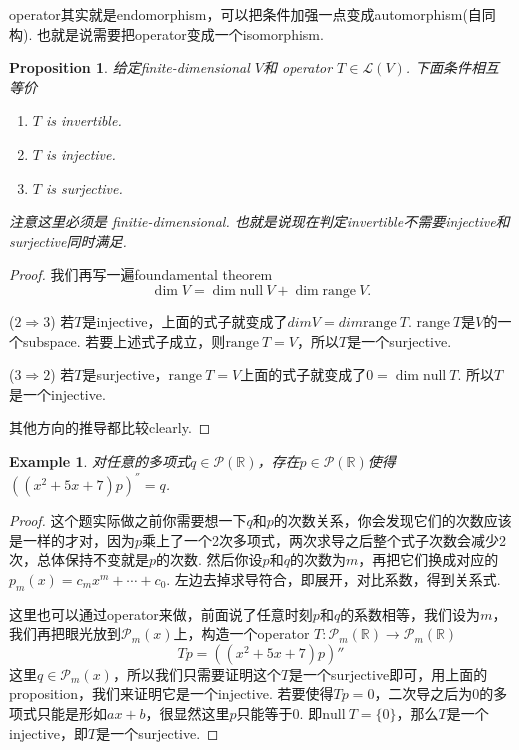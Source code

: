 \documentclass{article}
\newtheorem{proposition}[theorem]{Proposition}
\newtheorem{example}[theorem]{Example}
\newcommand*{\xfunc}[4]{{#2}\colon{#3}{#1}{#4}}
\newcommand*{\func}[3]{\xfunc{\to}{#1}{#2}{#3}}
\newcommand\nul[1]{\text{null}\ #1}
\newcommand\range[1]{\text{range}\ #1}
\begin{document}
{\color{blue} operator其实就是endomorphism，可以把条件加强一点变成automorphism(自同构). 也就是说需要把operator变成一个isomorphism}.

\begin{proposition}
\rm 给定finite-dimensional $V$和 operator $T \in \mathcal{L}(V)$. 下面条件相互等价
\begin{enumerate}
	\item $T$ is invertible.
	\item $T$ is injective.
	\item $T$ is surjective.
\end{enumerate}
注意这里必须是{\color{red} finitie-dimensional}. 也就是说现在判定invertible不需要injective和surjective同时满足.
\end{proposition}

\begin{proof}
我们再写一遍foundamental theorem
$$
\dim V  = \dim \nul{V}  + \dim \range{V}.
$$

($2 \Rightarrow 3$) 若$T$是injective，上面的式子就变成了$dim V = dim \range{T}$. $\range{T}$是$V$的一个subspace. 若要上述式子成立，则$\range{T} = V$，所以$T$是一个surjective.

($3 \Rightarrow 2$) 若$T$是surjective，$\range{T} = V$上面的式子就变成了$0 = \dim\nul{T}$. 所以$T$是一个injective. 

其他方向的推导都比较clearly.
\end{proof}

\begin{example}
对任意的多项式$q \in \mathcal{P}(\mathbb{R})$，存在$p \in \mathcal{P}(\mathbb{R})$使得$((x^2+5x+7)p)^{''}=q$.
\end{example}

\begin{proof}
这个题实际做之前你需要想一下$q$和$p$的次数关系，你会发现它们的次数应该是一样的才对，因为$p$乘上了一个2次多项式，两次求导之后整个式子次数会减少2次，总体保持不变就是$p$的次数. 然后你设$p$和$q$的次数为$m$，再把它们换成对应的$p_m(x)=c_mx^m+\cdots+c_0$. 左边去掉求导符合，即展开，对比系数，得到关系式.

这里也可以通过operator来做，前面说了任意时刻$p$和$q$的系数相等，我们设为$m$，我们再把眼光放到$\mathcal{P}_m(x)$上，构造一个operator $\func{T}{\mathcal{P}_m(\mathbb{R})}{\mathcal{P}_m(\mathbb{R})}$
$$
Tp = ((x^2+5x+7)p)''
$$
这里$q \in \mathcal{P}_m(x)$，所以我们只需要证明这个$T$是一个surjective即可，用上面的proposition，我们来证明它是一个injective. 若要使得$Tp = 0$，二次导之后为0的多项式只能是形如$ax+b$，很显然这里$p$只能等于$0$. 即$\nul{T} = \{0\}$，那么$T$是一个injective，即$T$是一个surjective.
\end{proof}
\end{document}
